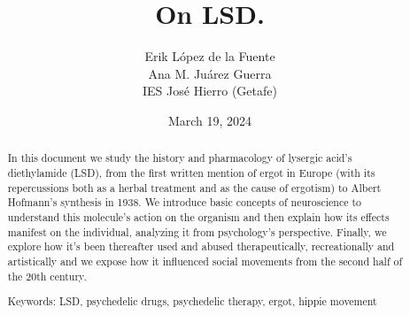 \documentclass[a4paper, titlepage]{article}
\title{On LSD.}
\author{Erik López de la Fuente \\ Ana M. Juárez Guerra \\ IES José Hierro (Getafe)}
\date{March 19, 2024}
\begin{document}
\maketitle

\begin{abstract}
In this document we study the history and pharmacology of lysergic acid's diethylamide (LSD), from the first written mention of ergot in Europe (with its repercussions both as a herbal treatment and as the cause of ergotism) to Albert Hofmann's synthesis in 1938. We introduce basic concepts of neuroscience to understand this molecule's action on the organism and then explain how its effects manifest on the individual, analyzing it from psychology's perspective. Finally, we explore how it's been thereafter used and abused therapeutically, recreationally and artistically and we expose how it influenced social movements from the second half of the 20th century.

Keywords: LSD, psychedelic drugs, psychedelic therapy, ergot, hippie movement
\end{abstract}



\tableofcontents

\newpage









\nocite{*}


\end{document}
